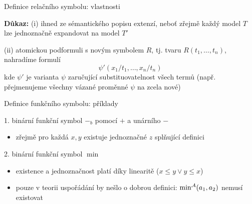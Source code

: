 \documentclass{beamer}
\begin{document}
\begin{frame}{Definice relačního symbolu: vlastnosti}
    

    \textbf{Důkaz:} \alert{(i)} ihned ze sémantického popisu extenzí, neboť zřejmě každý model $T$ lze \alert{jednoznačně} expandovat na model $T'$

    \alert{(ii)} atomickou podformuli s novým symbolem $R$, tj. tvaru \alert{$R(t_1,\dots,t_n)$}, nahradíme formulí
    $$
    \psi'(x_1/t_1,\dots,x_n/t_n)
    $$
    kde $\psi'$ je \alert{varianta $\psi$ zaručující substituovatelnost} všech termů (např. přejmenujeme všechny vázané proměnné $\psi$ na zcela nové)\hfill\qedsymbol

\end{frame}


\begin{frame}{Definice funkčního symbolu: příklady}
    

    \bigskip

    1.  binární funkční symbol \alert{$-_b$} pomocí $+$ a unárního $-$
        

    \begin{itemize}
        \item zřejmě pro každá $x,y$ \alert{existuje} \alert{jednoznačné} $z$ splňující definici  
    \end{itemize}
        
    \bigskip
    
    2.  binární funkční symbol \alert{$\min$}
        

    \begin{itemize}
        \item existence a jednoznačnost platí díky linearitě ($x\leq y\lor y\leq x$)
        \item pouze v teorii uspořádání by nešlo o dobrou definici: $\min^{\mathcal{A}}(a_1,a_2)$ nemusí existovat
    \end{itemize}        
    
\end{frame}
\end{document}
